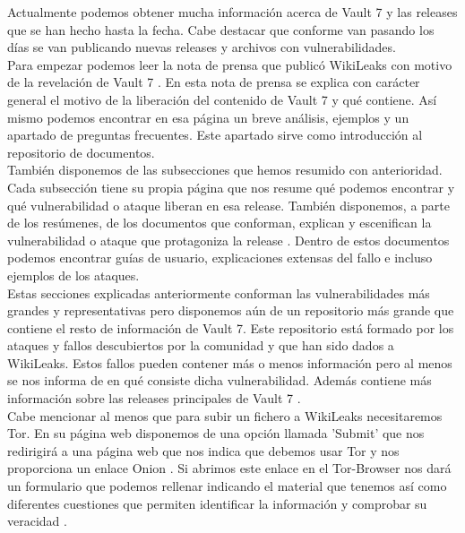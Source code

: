 Actualmente podemos obtener mucha información acerca de Vault 7 y las releases que se han hecho hasta la fecha. Cabe destacar que conforme van pasando los días se van publicando nuevas releases y archivos con vulnerabilidades.\\
Para empezar podemos leer la nota de prensa que publicó WikiLeaks con motivo de la revelación de Vault 7 \cite{wikileaks-press-release}. En esta nota de prensa se explica con carácter general el motivo de la liberación del contenido de Vault 7 y qué contiene. Así mismo podemos encontrar en esa página un breve análisis, ejemplos y un apartado de preguntas frecuentes. Este apartado sirve como introducción al repositorio de documentos.\\
También disponemos de las subsecciones que hemos resumido con anterioridad. Cada subsección tiene su propia página que nos resume qué podemos encontrar y qué vulnerabilidad o ataque liberan en esa release. También disponemos, a parte de los resúmenes, de los documentos que conforman, explican y escenifican la vulnerabilidad o ataque que protagoniza la release \cite{releases-documents}. Dentro de estos documentos podemos encontrar guías de usuario, explicaciones extensas del fallo e incluso ejemplos de los ataques.\\
Estas secciones explicadas anteriormente conforman las vulnerabilidades más grandes y representativas pero disponemos aún de un repositorio más grande que contiene el resto de información de Vault 7. Este repositorio está formado por los ataques y fallos descubiertos por la comunidad y que han sido dados a WikiLeaks. Estos fallos pueden contener más o menos información pero al menos se nos informa de en qué consiste dicha vulnerabilidad. Además contiene más información sobre las releases principales de Vault 7 \cite{vault7-documents}.\\
Cabe mencionar al menos que para subir un fichero a WikiLeaks necesitaremos Tor. En su página web disponemos de una opción llamada 'Submit' que nos redirigirá a una página web que nos indica que debemos usar Tor y nos proporciona un enlace Onion \cite{vault7-submit}. Si abrimos este enlace en el Tor-Browser nos dará un formulario que podemos rellenar indicando el material que tenemos así como diferentes cuestiones que permiten identificar la información y comprobar su veracidad \cite{wikileaks-tor-submit}.